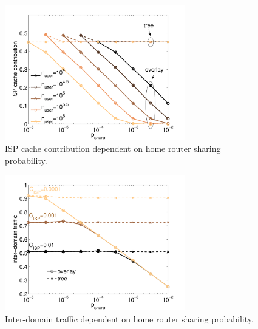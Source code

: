 \begin{figure}[tb]
  \centering
  \includegraphics[width=0.7\textwidth]{hierarchical/simulative/figures/overlay_nuser_ISPcontrib3}
  \caption{ISP cache contribution dependent on home router sharing probability.}
  \label{fig:overlay_nuser_ISPcontrib}
\end{figure}

\begin{figure}[tb]
  \centering
  \includegraphics[width=0.7\textwidth]{hierarchical/simulative/figures/overlay_interdomain3}
  \caption{Inter-domain traffic dependent on home router sharing probability.}
  \label{fig:overlay_interdomain}
\end{figure}


